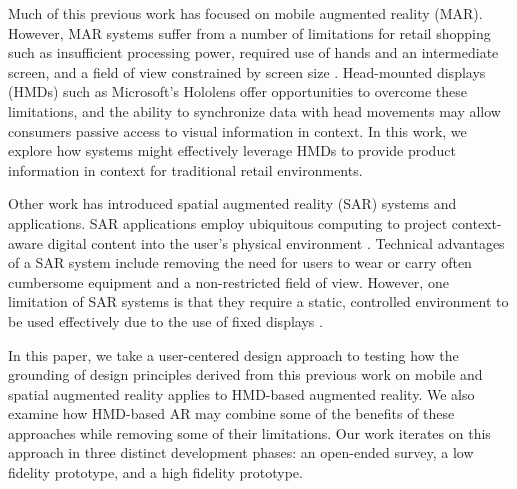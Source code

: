 Much of this previous work has focused on mobile augmented reality (MAR). However, MAR systems suffer from a number of limitations for retail shopping such as insufficient processing power, required use of hands and an intermediate screen, and a field of view constrained by screen size \cite{bimber2005spatial}. Head-mounted displays (HMDs) such as Microsoft's Hololens offer opportunities to overcome these limitations, and the ability to synchronize data with head movements may allow consumers passive access to visual information in context. In this work, we explore how systems might effectively leverage HMDs to provide product information in context for traditional retail environments. 

Other work has introduced spatial augmented reality (SAR) systems and applications.  SAR applications employ ubiquitous computing to project context-aware digital content into the user's physical environment \cite{benko2015fovear,benko2014dyadic}.  Technical advantages of a SAR system include removing the need for users to wear or carry often cumbersome equipment and a non-restricted field of view.  
However, one limitation of SAR systems is that they require a static, controlled environment to be used effectively due to the use of fixed displays \cite{bimber2005spatial}.

In this paper, we take a user-centered design approach to testing how the grounding of design principles derived from this previous work on mobile and spatial augmented reality applies to HMD-based augmented reality. We also examine how HMD-based AR may combine some of the benefits of these approaches while removing some of their limitations. Our work iterates on this approach in three distinct development phases: an open-ended survey, a low fidelity prototype, and a high fidelity prototype.